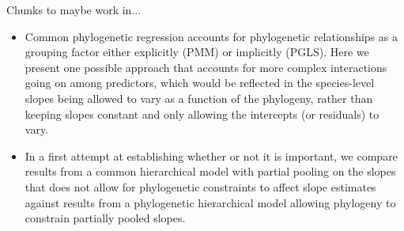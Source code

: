 \documentclass{article}\usepackage[]{graphicx}\usepackage[]{color}
\begin{document}
Chunks to maybe work in... 
\begin{itemize}
\item Common phylogenetic regression accounts for phylogenetic relationships as a grouping factor either explicitly (PMM) or implicitly (PGLS). Here we present one possible approach that accounts for more complex interactions going on among predictors, which would be reflected in the species-level slopes being allowed to vary as a function of the phylogeny, rather than keeping slopes constant and only allowing the intercepts (or residuals) to vary. 
\item In a first attempt at establishing whether or not it is important, we compare results from a common hierarchical model with partial pooling on the slopes that does not allow for phylogenetic constraints to affect slope estimates against results from a phylogenetic hierarchical model allowing phylogeny to constrain partially pooled slopes. 
\end{itemize}

\end{document}
